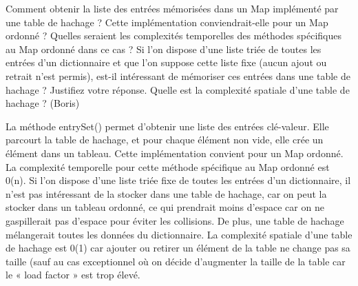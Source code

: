 Comment obtenir la liste des entrées mémorisées dans un Map implémenté par une table de hachage ? Cette implémentation conviendrait-elle pour un Map ordonné ? Quelles seraient les complexités temporelles des méthodes spécifiques au Map ordonné dans ce cas ? Si l’on dispose d’une liste triée de toutes les entrées d’un dictionnaire et que l’on suppose cette liste fixe (aucun ajout ou retrait n’est permis), est-il intéressant de mémoriser ces entrées dans une table de hachage ? Justifiez votre réponse. Quelle est la complexité spatiale d’une table de hachage ? (Boris)

La méthode entrySet() permet d’obtenir une liste des entrées clé-valeur. Elle parcourt la table de hachage, et pour chaque élément non vide, elle crée un élément dans un tableau. Cette implémentation convient pour un Map ordonné. La complexité temporelle pour cette méthode spécifique au Map ordonné est 0(n). Si l’on dispose d’une liste triée fixe de toutes les entrées d’un dictionnaire, il n’est pas intéressant de la stocker dans une table de hachage, car on peut la stocker dans un tableau ordonné, ce qui prendrait moins d’espace car on ne gaspillerait pas d’espace pour éviter les collisions. De plus, une table de hachage mélangerait toutes les données du dictionnaire. La complexité spatiale d’une table de hachage est 0(1) car ajouter ou retirer un élément de la table ne change pas sa taille (sauf au cas exceptionnel où on décide d’augmenter la taille de la table car le « load factor » est trop élevé.